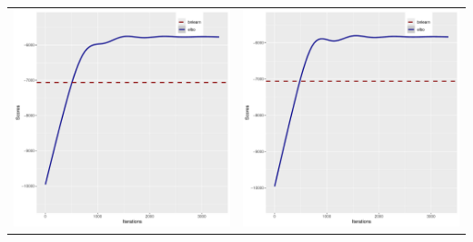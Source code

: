 \documentclass[]{scrartcl}
\begin{document}
\begin{tabular}{cc}
\includegraphics[scale = 0.4]{./figs/alarm/mapEvolution-3-3332.pdf} &
\includegraphics[scale = 0.4]{./figs/alarm/mapEvolution-4-3332.pdf} \\
\end{tabular}
\end{document}
